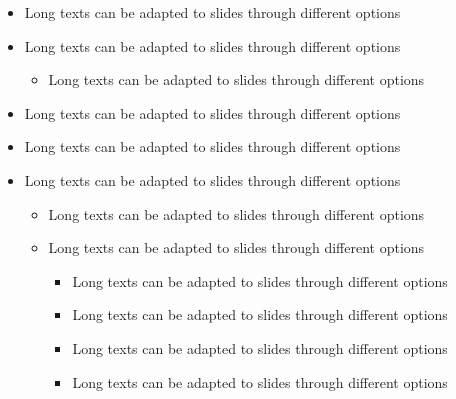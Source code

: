 \documentclass[usepdftitle=false,professionalfonts,compress ]{beamer}
\begin{document}
{\begin{frame}[allowframebreaks]
\begin{itemize}
\begin{itemize}
\begin{itemize}
				\end{itemize}

			\item Long texts can be adapted to slides through different options

				\end{itemize}

			\item Long texts can be adapted to slides through different options

			\item Long texts can be adapted to slides through different options


	\begin{itemize}

	\item Long texts can be adapted to slides through different options

				\end{itemize}

			\item Long texts can be adapted to slides through different options

			\item Long texts can be adapted to slides through different options

			\item Long texts can be adapted to slides through different options


	\begin{itemize}

	\item Long texts can be adapted to slides through different options

			\item Long texts can be adapted to slides through different options


	\begin{itemize}

	\item Long texts can be adapted to slides through different options

			\item Long texts can be adapted to slides through different options

			\item Long texts can be adapted to slides through different options

			\item Long texts can be adapted to slides through different options

				\end{itemize}


\end{itemize}
\end{itemize}
\end{frame}}
\end{document}
